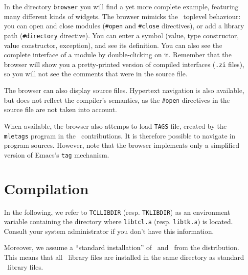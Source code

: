
In the directory {\tt browser} you will find a yet more complete example,
featuring many different kinds of widgets. The browser mimicks the 
\caml\ toplevel behaviour: you can open and close modules ({\tt \#open} and
{\tt \#close} directives), or add a library path ({\tt \#directory} directive).
You can enter a symbol (value, type constructor, value constructor,
exception), and see its definition. You can also see the complete interface
of a module by double-clicking on it. 
Remember that the browser will show you a pretty-printed version
of compiled interfaces ({\tt .zi} files), so you will not see the comments
that were in the source file.

The browser can also display source files. Hypertext navigation is also
available, but does not reflect the compiler's semantics,
as the \verb|#open| directives in the source file are not taken into
account.

When available, the browser also attemps to load {\tt TAGS} file, created by
the {\tt mletags} program in the \caml\ contributions. It is therefore
possible to navigate in program sources. However, note that the browser
implements only a simplified version of Emacs's {\tt tag} mechanism.

\section{Compilation}
In the following, we refer to \verb|TCLLIBDIR| (resp. \verb|TKLIBDIR|) as
an environment variable containing the directory where \verb|libtcl.a|
(resp. \verb|libtk.a|) is located. Consult your system administrator if you
don't have this information. 

Moreover, we assume a ``standard installation'' of \caml\ and \camltk\ from
the distribution. This means that all \camltk\ library files are installed
in the same directory as standard \caml\ library files.

